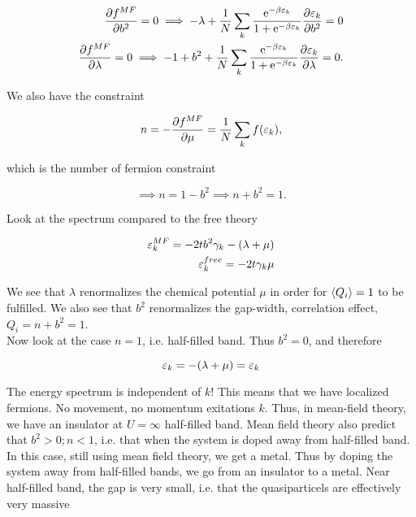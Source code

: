 \begin{align*}
    \pdv{f^{MF}}{b^2} = 0 \implies -\lambda + \frac{1}{N}\sum_k \frac{\mathrm{e}^{-\beta \varepsilon_k}}{1 + \mathrm{e}^{-\beta \varepsilon_k}} \pdv{\varepsilon_k}{b^2} = 0 \\
    \pdv{f^{MF}}{\lambda} = 0 \implies -1 + b^2  + \frac{1}{N}\sum_k \frac{\mathrm{e}^{-\beta \varepsilon_k}}{1 + \mathrm{e}^{-\beta \varepsilon_k}} \pdv{\varepsilon_k}{\lambda} = 0. 
\end{align*}

We also have the constraint 

\begin{equation*}
    n = - \pdv{f^{MF}}{\mu} = \frac{1}{N}\sum_k f(\varepsilon_k),
\end{equation*}

which is the number of fermion constraint 

\begin{equation*}
    \implies n = 1 -b^2 \implies n + b^2 = 1.
\end{equation*}

Look at the spectrum compared to the free theory

\begin{align*}
    \varepsilon_k^{MF} = -2tb^2 \gamma_k - (\lambda + \mu) \\
    \varepsilon_k ^{free} = -2t\gamma_k \mu 
\end{align*}

We see that $\lambda$ renormalizes the chemical potential $\mu$ in order for $\expval{Q_i} = 1$ to be fulfilled. We also see that $b^2$ renormalizes the gap-width, correlation effect, $Q_i = n +b^2 = 1$. \\

Now look at the case $n = 1$, i.e. half-filled band. Thus $b^2 = 0$, and therefore 

\begin{equation*}
    \varepsilon_k = -(\lambda + \mu) = \varepsilon_k
\end{equation*}

The energy spectrum is independent of $k$! This means that we have localized fermions. No movement, no momentum exitations $k$. Thus, in mean-field theory, we have an insulator at $U = \infty$ half-filled band. Mean field theory also predict that $b^2 > 0 ; n < 1$, i.e. that when the system is doped away from half-filled band. In this case, still using mean field theory, we get a metal. Thus by doping the system away from half-filled bands, we go from an insulator to a metal. Near half-filled band, the gap is very small, i.e. that the quasiparticels are effectively very massive 


